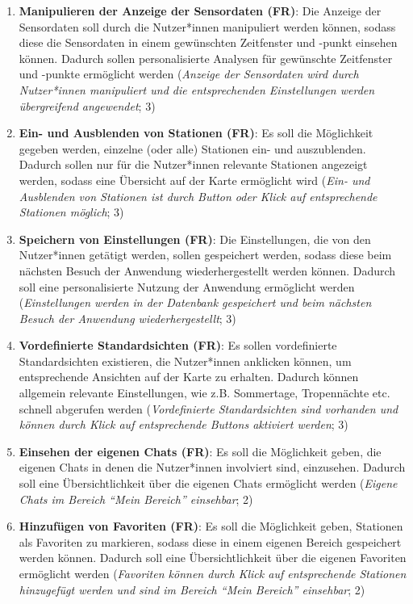 \begin{enumerate}
    \item \textbf{Manipulieren der Anzeige der Sensordaten (\ac{FR})}: Die Anzeige der Sensordaten soll durch die Nutzer*innen manipuliert werden können, sodass diese die Sensordaten in einem gewünschten Zeitfenster und -punkt einsehen können. Dadurch sollen personalisierte Analysen für gewünschte Zeitfenster und -punkte ermöglicht werden (\textit{Anzeige der Sensordaten wird durch Nutzer*innen manipuliert und die entsprechenden Einstellungen werden übergreifend angewendet}; 3)
    \item \textbf{Ein- und Ausblenden von Stationen (\ac{FR})}: Es soll die Möglichkeit gegeben werden, einzelne (oder alle) Stationen ein- und auszublenden. Dadurch sollen nur für die Nutzer*innen relevante Stationen angezeigt werden, sodass eine Übersicht auf der Karte ermöglicht wird (\textit{Ein- und Ausblenden von Stationen ist durch Button oder Klick auf entsprechende Stationen möglich}; 3)
    \item \textbf{Speichern von Einstellungen (\ac{FR})}: Die Einstellungen, die von den Nutzer*innen getätigt werden, sollen gespeichert werden, sodass diese beim nächsten Besuch der Anwendung wiederhergestellt werden können. Dadurch soll eine personalisierte Nutzung der Anwendung ermöglicht werden (\textit{Einstellungen werden in der Datenbank gespeichert und beim nächsten Besuch der Anwendung wiederhergestellt}; 3)
    \item \textbf{Vordefinierte Standardsichten (\ac{FR})}: Es sollen vordefinierte Standardsichten existieren, die Nutzer*innen anklicken können, um entsprechende Ansichten auf der Karte zu erhalten. Dadurch können allgemein relevante Einstellungen, wie z.B. Sommertage, Tropennächte etc. schnell abgerufen werden (\textit{Vordefinierte Standardsichten sind vorhanden und können durch Klick auf entsprechende Buttons aktiviert werden}; 3)
    \item \textbf{Einsehen der eigenen Chats (\ac{FR})}: Es soll die Möglichkeit geben, die eigenen Chats in denen die Nutzer*innen involviert sind, einzusehen. Dadurch soll eine Übersichtlichkeit über die eigenen Chats ermöglicht werden (\textit{Eigene Chats im Bereich \enquote{Mein Bereich} einsehbar}; 2)    
    \item \textbf{Hinzufügen von Favoriten (\ac{FR})}: Es soll die Möglichkeit geben, Stationen als Favoriten zu markieren, sodass diese in einem eigenen Bereich gespeichert werden können. Dadurch soll eine Übersichtlichkeit über die eigenen Favoriten ermöglicht werden (\textit{Favoriten können durch Klick auf entsprechende Stationen hinzugefügt werden und sind im Bereich \enquote{Mein Bereich} einsehbar}; 2)

\end{enumerate}
